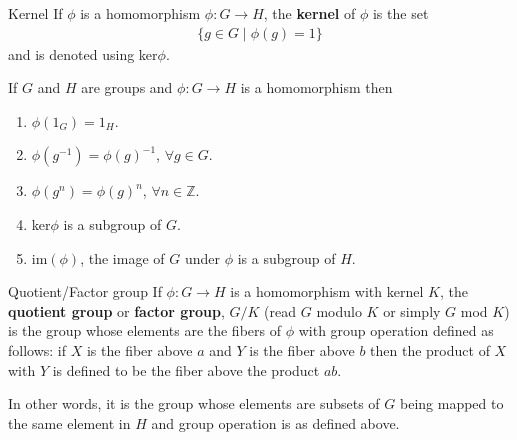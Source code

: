 \documentclass[titlepage, 12pt]{book}
\begin{document}
\begin{definition}{Kernel}{}
    If $\phi$ is a homomorphism $\phi:G\rightarrow H$, the \textbf{kernel} of
    $\phi$ is the set
    \begin{gather*}
        \{g\in G\mid\phi(g) = 1\}
    \end{gather*}
    and is denoted using ker$\phi$.
\end{definition}
If $G$ and $H$ are groups and $\phi:G\rightarrow H$ is a homomorphism
then
\begin{enumerate}
    \item$\phi(1_G) = 1_H$.
    \item$\phi(g^{-1}) = \phi(g)^{-1}$, $\forall g\in G$.
    \item$\phi(g^n) = \phi(g)^n$, $\forall n\in\mathbb{Z}$.
    \item ker$\phi$ is a subgroup of $G$.
    \item im$(\phi)$, the image of $G$ under $\phi$ is a subgroup of $H$.
\end{enumerate}

\begin{definition}{Quotient/Factor group}{}
    If $\phi:G\rightarrow H$ is a homomorphism with kernel $K$, the
    \textbf{quotient group} or \textbf{factor group}, $G/K$ (read $G$ modulo $K$
    or simply $G$ mod $K$) is the group whose elements are the fibers of $\phi$
    with group operation defined as follows: if $X$ is the fiber above $a$ and
    $Y$ is the fiber above $b$ then the product of $X$ with $Y$ is defined to be
    the fiber above the product $ab$.
\end{definition}
In other words, it is the group whose elements are subsets of $G$ being mapped
to the same element in $H$ and group operation is as defined above.
\end{document}
